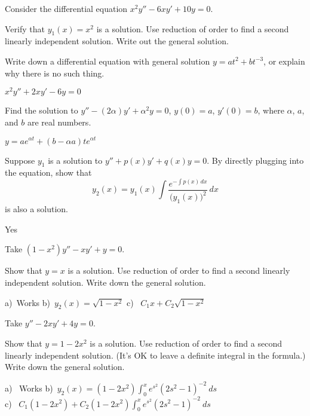 \begin{exercise}\ansMark%
Consider the differential equation $x^2y'' -6xy' + 10y = 0$.
\begin{tasks}
\task Verify that $y_1(x) = x^2$ is a solution.
\task Use reduction of order to find a second linearly independent solution.
\task Write out the general solution. 
\end{tasks}
\end{exercise}

\begin{exercise}
Write down a differential equation with general solution $y=at^2+bt^{-3}$, or explain why there is no such thing.
\end{exercise}
\comboSol{%
}
{%
$x^2y'' + 2xy' - 6y = 0$
}

\begin{exercise}
Find the solution to
$y''-(2\alpha) y' + \alpha^2 y=0$, $y(0) = a$, $y'(0)=b$,
where $\alpha$, $a$, and $b$ are real numbers.
\end{exercise}
\comboSol{%
}
{%
$y = ae^{\alpha t} + (b - \alpha a)te^{\alpha t}$
}

\begin{exercise} \label{exercise:reductionoforder}
Suppose $y_1$ is a solution to $y'' + p(x) y' + q(x) y = 0$.
By directly plugging into the equation,
show that
\begin{equation*}
y_2(x) = y_1(x) \int \frac{e^{-\int p(x)\,dx}}{{\bigl(y_1(x)\bigr)}^2} \,dx
\end{equation*}
is also a solution.
\end{exercise}
\comboSol{%
}
{%
Yes
}

\begin{exercise}
Take 
$(1-x^2)y''-xy' + y = 0$.
\begin{tasks}
\task Show that $y=x$ is a solution.
\task Use reduction of order to find a second linearly independent solution.
\task Write down the general solution.
\end{tasks}
\end{exercise}
\comboSol{%
}
{%
a)~Works \quad b)~$y_2(x) = \sqrt{1 - x^2}$ \quad c)~ $C_1x + C_2\sqrt{1-x^2}$
}

\begin{exercise}
Take 
$y''-2xy' + 4y = 0$.
\begin{tasks}
\task Show that $y=1-2x^2$ is a solution.  
\task Use reduction of order to find a second linearly independent solution.
(It's OK to leave a definite integral in the formula.)
\task Write down the general solution.
\end{tasks}
\end{exercise}
\comboSol{%
}
{%
a)~ Works \quad b)~$y_2(x) = (1-2x^2)\int_0^xe^{s^2}(2s^2 - 1)^{-2}\ ds$ \\ c)~ $C_1(1-2x^2) + C_2(1-2x^2)\int_0^xe^{s^2}(2s^2 - 1)^{-2}\ ds$
}

